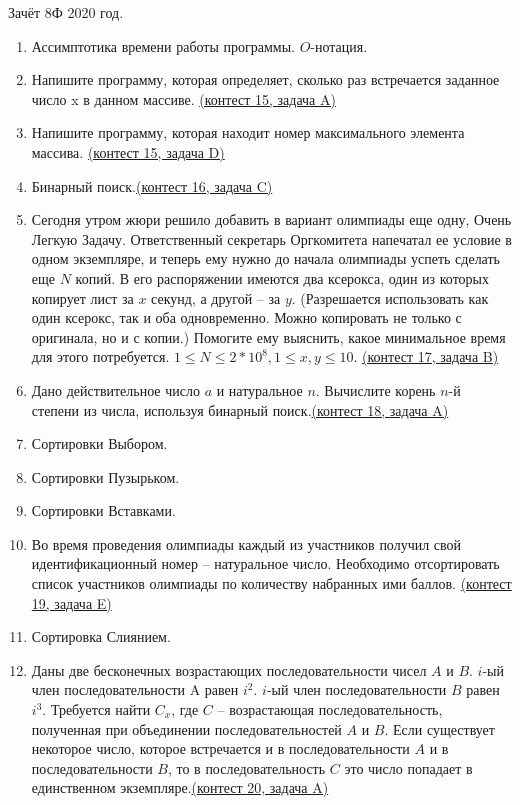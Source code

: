 \documentclass[a4paper,12pt]{article}
\begin{document}
Зачёт 8Ф 2020 год.
\begin{enumerate}
\item Ассимптотика времени работы программы. $O$-нотация.
\item Напишите программу, которая определяет, сколько раз встречается заданное число x в данном массиве. \href{https://informatics.msk.ru/mod/statements/view3.php?chapterid=223}{(контест 15, задача A)}
\item Напишите программу, которая находит номер максимального элемента массива. \href{https://informatics.msk.ru/mod/statements/view3.php?chapterid=228}{(контест 15, задача D)}
\item Бинарный поиск.\href{https://informatics.msk.ru/mod/statements/view3.php?chapterid=111728}{(контест 16, задача C)}
\item Сегодня утром жюри решило добавить в вариант олимпиады еще одну, Очень Легкую Задачу. Ответственный секретарь Оргкомитета напечатал ее условие в одном экземпляре, и теперь ему нужно до начала олимпиады успеть сделать еще $N$ копий. В его распоряжении имеются два ксерокса, один из которых копирует лист за $x$ секунд, а другой – за $y$. (Разрешается использовать как один ксерокс, так и оба одновременно. Можно копировать не только с оригинала, но и с копии.) Помогите ему выяснить, какое минимальное время для этого потребуется. $1\le N\le 2*10^8, 1\le x, y \le 10$. \href{https://informatics.msk.ru/mod/statements/view3.php?chapterid=490}{(контест 17, задача B)}
\item Дано действительное число $a$ и натуральное $n$. Вычислите корень $n$-й степени из числа, используя бинарный поиск.\href{https://informatics.msk.ru/mod/statements/view3.php?chapterid=3570}{(контест 18, задача A)}
\item Сортировки Выбором.
\item Сортировки Пузырьком.
\item Сортировки Вставками.
\item Во время проведения олимпиады каждый из участников получил свой идентификационный номер – натуральное число. Необходимо отсортировать список участников олимпиады по количеству набранных ими баллов. \href{https://informatics.msk.ru/mod/statements/view3.php?chapterid=1446}{(контест 19, задача E)}
\item Сортировка Слиянием.
\item Даны две бесконечных возрастающих последовательности чисел $A$ и $B$. $i$-ый член последовательности A равен $i^2$. $i$-ый член последовательности $B$ равен $i^3$. Требуется найти $C_x$, где $C$ – возрастающая последовательность, полученная при объединении последовательностей $A$ и $B$. Если существует некоторое число, которое встречается и в последовательности $A$ и в последовательности $B$, то в последовательность $C$ это число попадает в единственном экземпляре.\href{https://informatics.msk.ru/mod/statements/view3.php?chapterid=1442}{(контест 20, задача A)}

\end{enumerate}
\end{document}
